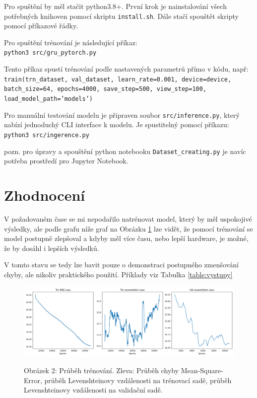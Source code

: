 \documentclass[a4paper]{article}
\theoremstyle{definition}
\begin{document}
Pro spuštění by měl stačit python3.8+. První krok je nainstalování všech potřebných knihoven pomocí skriptu \texttt{install.sh}. Dále stačí spouštět skripty pomocí příkazové řádky.

Pro spuštění trénování je následující příkaz: \\
\texttt{python3 src/gru\_pytorch.py}

Tento příkaz spustí trénování podle nastavených parametrů přímo v kódu, např: \\
\texttt{train(trn\_dataset, val\_dataset, learn\_rate=0.001, device=device, \\
batch\_size=64, epochs=4000, save\_step=500, view\_step=100, \\
load\_model\_path='models')}

Pro manuální testování modelu je připraven soubor \texttt{src/inference.py}, který nabízí jednoduchý CLI interface k modelu. Je spustitelný pomocí příkazu: \\
\texttt{python3 src/ingerence.py}

pozn. pro úpravy a spouštění python notebooku \texttt{Dataset\_creating.py} je navíc potřeba prostředí pro Jupyter Notebook.

\section{Zhodnocení}
V požadovaném čase se mi nepodařilo natrénovat model, který by měl uspokojivé výsledky, ale podle grafu níže graf na Obrázku \ref{png:graf_trenovani} lze vidět, že pomocí trénování se model postupně zlepšoval a kdyby měl více času, nebo lepší hardware, je možné, že by dosáhl i lepších výsledků.

V tomto stavu se tedy lze bavit pouze o demonstraci postupného zmenšování chyby, ale nikoliv praktického použití. Příklady viz Tabulka \ref{table:vystupy}


\begin{figure}[t!]
  \centering
  \includegraphics[width=4.5in]{torch_gru_8hid_250batch_21000epochs_losses.png}\\[1pt]  %
  \caption{Obrázek 2: Průběh trénování. Zleva: Průběh chyby Mean-Square-Error, průběh Levenshteinovy vzdálenosti na trénovací sadě, průběh Levenshteinovy vzdálenosti na validační sadě.}
  \label{png:graf_trenovani}
\end{figure}
\end{document}
